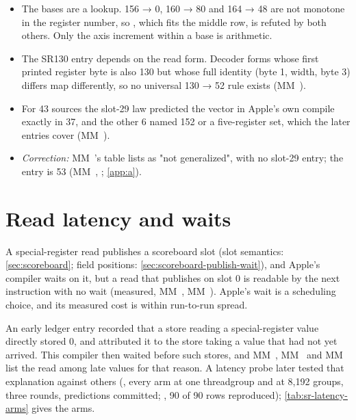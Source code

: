 \begin{itemize}
\item The bases are a lookup. 156 → 0, 160 → 80 and 164 → 48 are not monotone in the register number, so , which fits the middle row, is refuted by both others. Only the axis increment within a base is arithmetic.
\item The SR130 entry depends on the read form. Decoder forms whose first printed register byte is also 130 but whose full
  identity (byte 1, width, byte 3) differs map differently, so no universal 130 → 52 rule exists (MM~).
\item For 43 sources the slot-29 law predicted the vector in Apple's own compile exactly in
  37, and the other 6 named 152 or a five-register set, which the later entries cover (MM~).
\item \emph{Correction:} MM~'s table lists  as "not generalized", with no slot-29 entry; the entry is 53 (MM~,
  ; \cref{app:a}).
\end{itemize}

\section{Read latency and waits}\label{sec:read-latency-whether}

A special-register read publishes a scoreboard slot (slot semantics: \cref{sec:scoreboard}; field positions: 
\cref{sec:scoreboard-publish-wait}), and Apple's compiler waits on it, but a read that publishes on slot 0 is readable by the next instruction with no wait (measured, MM~, MM~). Apple's
wait is a scheduling choice, and its measured cost is within run-to-run spread.

An early ledger entry recorded that a store reading a special-register value
directly stored 0, and attributed it to the store taking a value that had not yet arrived. This compiler then waited before such stores, and
MM~, MM~ and MM~ list the read among late values for that reason. A latency probe later tested that explanation against others (, every arm at one threadgroup and at 8,192 groups, three rounds, predictions committed;
, 90 of 90 rows reproduced); \cref{tab:sr-latency-arms} gives the arms.

